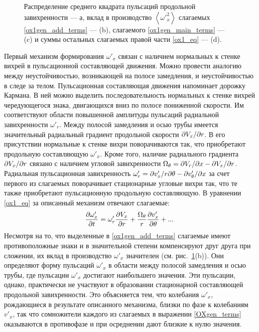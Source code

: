 \begin{figure}[h]
\caption{Распределение среднего квадрата пульсаций продольной завихренности --- а, вклад в производство $\left<\omega'^2_x \right>$ слагаемых \eqref{ox1gen_add_terms} --- (b), слагаемого \eqref{ox1gen_main_terms} --- (c) и суммы остальных слагаемых правой части \eqref{ox1_eq} --- (d).}
\label{ox1gen_pic}
\end{figure}


Первый механизм формирования $\omega'_x$ связан с наличием нормальных к стенке вихрей в пульсационной составляющей движения. Можно провести аналогию между неустойчивостью, возникающей на полосе замедления, и неустойчивостью в следе за телом. Пульсационная составляющая движения напоминает дорожку Кармана. В ней можно выделить последовательность нормальных к стенке вихрей чередующегося знака, двигающихся вниз по полосе пониженной скорости. Им соответствуют области повышенной амплитуды пульсаций радиальной завихренности $\omega'_r$. Между полосой замедления и осью трубы имеется значительный радиальный градиент продольной скорости $\partial V_x/ \partial r$. В его присутствии нормальные к стенке вихри поворачиваются так, что приобретают продольную составляющую $\omega'_x$. Кроме того, наличие радиального градиента $\partial V_x/ \partial r$ связано с наличием угловой завихренности $\Omega_\theta = \partial V_r / \partial x - \partial V_x / \partial r$. Радиальная пульсационная завихренность $\omega'_r = \partial v'_x / r \partial \theta - \partial v'_\theta / \partial x$ за счет первого из слагаемых поворачивает стационарные угловые вихри так, что те также приобретают пульсационную продольную составляющую. В уравнении \eqref{ox1_eq} за описанный механизм отвечают слагаемые:
\begin{equation}\label{ox1gen_add_terms}
\frac{\partial \omega'_x}{\partial t} = \omega'_r \frac {\partial V_x}{\partial r} +
\frac{\Omega_\theta}{r} \frac{\partial v'_x}{\partial \theta} + ...
\end{equation}
Несмотря на то, что выделенные в \eqref{ox1gen_add_terms} слагаемые имеют противоположные знаки и в значительной степени компенсируют друг друга при сложении, их вклад в производство $\omega'_x$ значителен (см. рис.~\ref{ox1gen_pic}(b)). Они определяют форму пульсаций $\omega'_x$ в области между полосой замедления и осью трубы, где пульсации $\omega'_x$ достигают наибольшего значения. Эти пульсации, однако, практически не участвуют в образовании стационарной составляющей продольной завихренности. Это объясняется тем, что колебания $\omega'_x$, рождающиеся в результате описанного механизма, близки по фазе к колебаниям $v'_x$, так что сомножители каждого из слагаемых в выражении \eqref{OXgen_terms} оказываются в противофазе и при осреднении дают близкие к нулю значения.


